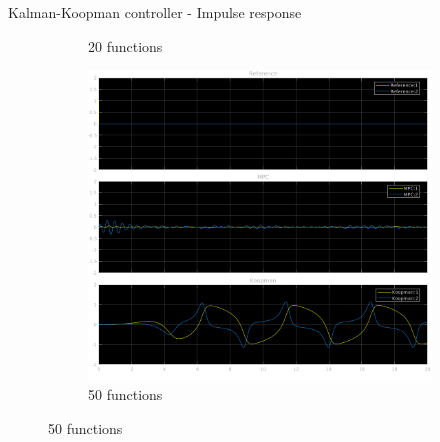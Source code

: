 \documentclass{beamer}
\begin{document}
\begin{frame}{Kalman-Koopman controller - Impulse response}
\begin{figure}
\begin{subfigure}[b]{0.3\textwidth}
            \caption{20 functions}
        \end{subfigure}
        \hfill
        \begin{subfigure}[b]{0.3\textwidth}
            \centering
            \includegraphics[width=\textwidth]{KK_50_Pulse.png}
            \caption{50 functions}
        \end{subfigure}
    \end{figure}
\end{frame}
\end{document}
